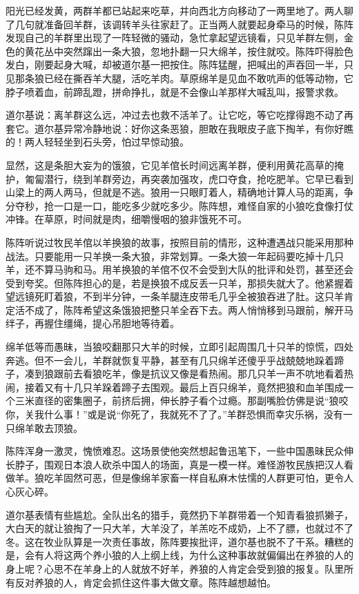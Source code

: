 \par 
\par 阳光已经发黄，两群羊都已站起来吃草，并向西北方向移动了一两里地了。两人聊了几句就准备回羊群，该调转羊头往家赶了。正当两人就要起身牵马的时候，陈阵发现自己的羊群里出现了一阵轻微的骚动，急忙拿起望远镜看，只见羊群左侧，金色的黄花丛中突然蹿出一条大狼，忽地扑翻一只大绵羊，按住就咬。陈阵吓得脸色发白，刚要起身大喊，却被道尔基一把按住。陈阵猛醒，把喊出的声吞回一半，只见那条狼已经在撕吞羊大腿，活吃羊肉。草原绵羊是见血不敢吭声的低等动物，它脖子喷着血，前蹄乱蹬，拼命挣扎，就是不会像山羊那样大喊乱叫，报警求救。
\par 道尔基说：离羊群这么远，冲过去也救不活羊了。让它吃，等它吃撑得跑不动了再套它。道尔基异常冷静地说：好你这条恶狼，胆敢在我眼皮子底下掏羊，有你好瞧的！两人轻轻坐到石头旁，怕过早惊动狼。
\par 显然，这是条胆大妄为的饿狼，它见羊倌长时间远离羊群，便利用黄花高草的掩护，匍匐潜行，绕到羊群旁边，再突袭加强攻，虎口夺食，抢吃肥羊。它早已看到山梁上的两人两马，但就是不逃。狼用一只眼盯着人，精确地计算人马的距离，争分夺秒，抢一口是一口，能吃多少就吃多少。陈阵想，难怪自家的小狼吃食像打仗冲锋。在草原，时间就是肉，细嚼慢咽的狼非饿死不可。
\par 陈阵听说过牧民羊倌以羊换狼的故事，按照目前的情形，这种遭遇战只能采用那种战法。只要能用一只羊换一条大狼，非常划算。一条大狼一年起码要吃掉十几只羊，还不算马驹和马。用羊换狼的羊倌不仅不会受到大队的批评和处罚，甚至还会受到夸奖。但陈阵担心的是，若是换狼不成反丢一只羊，那损失就大了。他紧握着望远镜死盯着狼，不到半分钟，一条羊腿连皮带毛几乎全被狼吞进了肚。这只羊肯定活不成了，陈阵希望这条饿狼把整只羊全吞下去。两人悄悄移到马跟前，解开马绊子，再握住缰绳，提心吊胆地等待着。
\par 绵羊低等而愚昧，当狼咬翻那只大羊的时候，立即引起周围几十只羊的惊慌，四处奔逃。但不一会儿，羊群就恢复平静，甚至有几只绵羊还傻乎乎战兢兢地跺着蹄子，凑到狼跟前去看狼吃羊，像是抗议又像是看热闹。那几只羊一声不吭地看着热闹，接着又有十几只羊跺着蹄子去围观。最后上百只绵羊，竟然把狼和血羊围成一个三米直径的密集圈子，前挤后拥，伸长脖子看个过瘾。那副嘴脸仿佛是说“狼咬你，关我什么事！”或是说“你死了，我就死不了了。”羊群恐惧而幸灾乐祸，没有一只绵羊敢去顶狼。
\par 陈阵浑身一激灵，愧愤难忍。这场景使他突然想起鲁迅笔下，一些中国愚昧民众伸长脖子，围观日本浪人砍杀中国人的场面，真是一模一样。难怪游牧民族把汉人看做羊。狼吃羊固然可恶，但是像绵羊家畜一样自私麻木怯懦的人群更可怕，更令人心灰心碎。
\par 道尔基表情有些尴尬。全队出名的猎手，竟然扔下羊群带着一个知青看狼抓獭子，大白天的就让狼掏了一只大羊，大羊没了，羊羔吃不成奶，上不了膘，也就过不了冬。这在牧业队算是一次责任事故，陈阵要挨批评，道尔基也脱不了干系。糟糕的是，会有人将这两个养小狼的人上纲上线，为什么这种事故就偏偏出在养狼的人的身上呢？心思不在羊身上的人就放不好羊，养狼的人肯定会受到狼的报复。队里所有反对养狼的人，肯定会抓住这件事大做文章。陈阵越想越怕。
